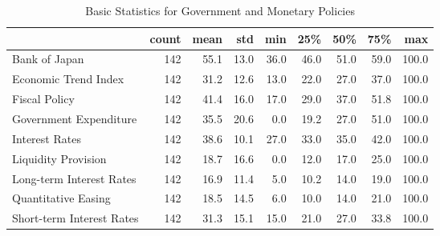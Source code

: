 \documentclass[a4paper,12pt]{article}
\begin{document}
        
        \begin{landscape}
        \begin{table}
\caption{Basic Statistics for Government and Monetary Policies}
\label{tab:statistics_Government_and_Monetary_Policies}
\begin{tabular}{lrrrrrrrr}
\toprule
 & count & mean & std & min & 25\% & 50\% & 75\% & max \\
\midrule
Bank of Japan & 142 & 55.1 & 13.0 & 36.0 & 46.0 & 51.0 & 59.0 & 100.0 \\
Economic Trend Index & 142 & 31.2 & 12.6 & 13.0 & 22.0 & 27.0 & 37.0 & 100.0 \\
Fiscal Policy & 142 & 41.4 & 16.0 & 17.0 & 29.0 & 37.0 & 51.8 & 100.0 \\
Government Expenditure & 142 & 35.5 & 20.6 & 0.0 & 19.2 & 27.0 & 51.0 & 100.0 \\
Interest Rates & 142 & 38.6 & 10.1 & 27.0 & 33.0 & 35.0 & 42.0 & 100.0 \\
Liquidity Provision & 142 & 18.7 & 16.6 & 0.0 & 12.0 & 17.0 & 25.0 & 100.0 \\
Long-term Interest Rates & 142 & 16.9 & 11.4 & 5.0 & 10.2 & 14.0 & 19.0 & 100.0 \\
Quantitative Easing & 142 & 18.5 & 14.5 & 6.0 & 10.0 & 14.0 & 21.0 & 100.0 \\
Short-term Interest Rates & 142 & 31.3 & 15.1 & 15.0 & 21.0 & 27.0 & 33.8 & 100.0 \\
\bottomrule
\end{tabular}
\end{table}

        \end{landscape}
        
        
\end{document}
